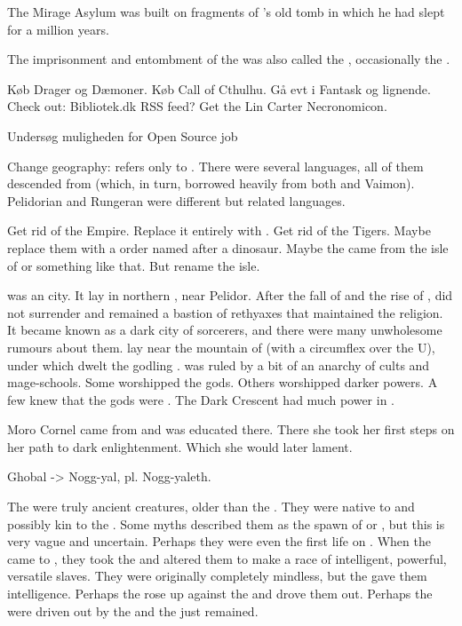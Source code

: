 The Mirage Asylum was built on fragments of \Ishnaruchaefir's old tomb in which he had slept for a million years.

The imprisonment and entombment of the \dragons was also called the , occasionally the .

Køb Drager og Dæmoner.
Køb Call of Cthulhu.
Gå evt i Fantask og lignende.
Check out: Bibliotek.dk RSS feed?
Get the Lin Carter Necronomicon.

Undersøg muligheden for Open Source job

Change geography:
\quo{\Velcad} refers only to \Galessan.
There were several \Velcadian languages, all of them descended from \Tepharin (which, in turn, borrowed heavily from both \Ortaican and Vaimon).
Pelidorian and Rungeran were different but related languages.

Get rid of the \Velcadian Empire.
Replace it entirely with \Tepharae.
Get rid of the Tigers.
Maybe replace them with a \Tepharin order named after a dinosaur.
Maybe the \Tepharins came from the isle of \Velcad or something like that.
But rename the isle.

\Yormis was an \Ortaican city.
It lay in northern \Velcad, near Pelidor.
After the fall of \Ortaica and the rise of \Iquinian \Tepharae, \Yormis did not surrender and remained a bastion of rethyaxes that maintained the \Ortaican religion.
It became known as a dark city of sorcerers, and there were many unwholesome rumours about them.
\Yormis lay near the mountain of \Shrun (with a circumflex over the U), under which dwelt the \xs godling \Ubloth.
\Yormis was ruled by a bit of an anarchy of cults and mage-schools.
Some worshipped the \Ortaican gods.
Others worshipped darker powers.
A few knew that the \Ortaican gods were \xss.
The Dark Crescent had much power in \Yormis.

Moro Cornel came from \Yormis and was educated there.
There she took her first steps on her path to dark enlightenment.
Which she would later lament.

Ghobal -> Nogg-yal, pl. Nogg-yaleth.

The \noggyaleth were truly ancient creatures, older than the \ophidians.
They were native to \Miith and possibly kin to the \xss.
Some \draconic myths described them as the spawn of \RuinSatha or \KyaethemChreiAz, but this is very vague and uncertain.
Perhaps they were even the first life on \Miith.
When the \voyagers came to \Miith, they took the \noggyaleth and altered them to make a race of intelligent, powerful, versatile slaves.
They were originally completely mindless, but the \voyagers gave them intelligence.
Perhaps the \noggyaleth rose up against the \voyagers and drove them out.
Perhaps the \voyagers were driven out by the \xss and the \noggyaleth just remained.

